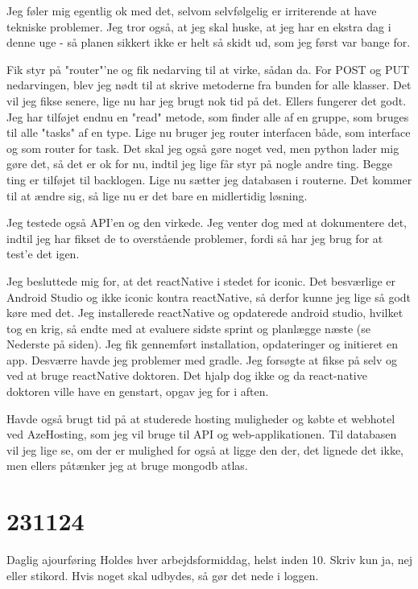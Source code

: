 \documentclass{report}
\begin{document}
Jeg føler mig egentlig ok med det, selvom selvfølgelig er irriterende at have tekniske problemer. Jeg tror også, at jeg skal huske, at jeg har en ekstra dag i denne uge - så planen sikkert ikke er helt så skidt ud, som jeg først var bange for.
 
Fik styr på "router"'ne og fik nedarving til at virke, sådan da. For POST og PUT nedarvingen, blev jeg nødt til at skrive metoderne fra bunden for alle klasser. Det vil jeg fikse senere, lige nu har jeg brugt nok tid på det.
Ellers fungerer det godt. Jeg har tilføjet endnu en "read" metode, som finder alle af en gruppe, som bruges til alle "tasks" af en type. Lige nu bruger jeg router interfacen både, som interface og som router for task. Det skal jeg også gøre noget ved, men python lader mig gøre det, så det er ok for nu, indtil jeg lige får styr på nogle andre ting.
Begge ting er tilføjet til backlogen.
Lige nu sætter jeg databasen i routerne. Det kommer til at ændre sig, så lige nu er det bare en midlertidig løsning.
 
Jeg testede også API'en og den virkede.
Jeg venter dog med at dokumentere det, indtil jeg har fikset de to overstående problemer, fordi så har jeg brug for at test'e det igen.
 
Jeg besluttede mig for, at det reactNative i stedet for iconic. Det besværlige er Android Studio og ikke iconic kontra reactNative, så derfor kunne jeg lige så godt køre med det. Jeg installerede reactNative og opdaterede android studio, hvilket tog en krig, så endte med at evaluere sidste sprint og planlægge næste (se Nederste på siden).
Jeg fik gennemført installation, opdateringer og initieret en app. Desværre havde jeg problemer med gradle. Jeg forsøgte at fikse på selv og ved at bruge reactNative doktoren. Det hjalp dog ikke og da react-native doktoren ville have en genstart, opgav jeg for i aften.
 
Havde også brugt tid på at studerede hosting muligheder og købte et webhotel ved AzeHosting, som jeg vil bruge til API og web-applikationen. Til databasen vil jeg lige se, om der er mulighed for også at ligge den der, det lignede det ikke, men ellers påtænker jeg at bruge mongodb atlas.

\section{231124}
Daglig ajourføring
Holdes hver arbejdsformiddag, helst inden 10. Skriv kun ja, nej eller stikord. Hvis noget skal udbydes, så gør det nede i loggen.
 
\end{document}
